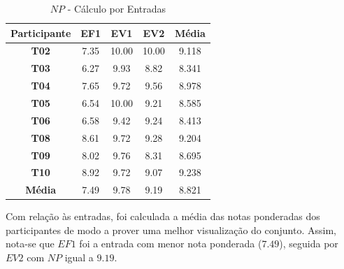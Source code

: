 \begin{table}[htbp]
	\centering
	\caption{$NP$ - Cálculo por Entradas}
	\begin{tabular}{|c|c|c|c|c|}
		\hline
		\rowcolor[HTML]{D0CECE} 
		\textbf{Participante} & \textbf{EF1} & \textbf{EV1} & \textbf{EV2} & \textbf{Média} \\ \hline
		\textbf{T02}          & 7.35         & 10.00        & 10.00        & 9.118          \\ \hline
		\rowcolor[HTML]{F2F2F2} 
		\textbf{T03}          & 6.27         & 9.93         & 8.82         & 8.341          \\ \hline
		\textbf{T04}          & 7.65         & 9.72         & 9.56         & 8.978          \\ \hline
		\rowcolor[HTML]{F2F2F2} 
		\textbf{T05}          & 6.54         & 10.00        & 9.21         & 8.585          \\ \hline
		\textbf{T06}          & 6.58         & 9.42         & 9.24         & 8.413          \\ \hline
		\rowcolor[HTML]{F2F2F2} 
		\textbf{T08}          & 8.61         & 9.72         & 9.28         & 9.204          \\ \hline
		\textbf{T09}          & 8.02         & 9.76         & 8.31         & 8.695          \\ \hline
		\rowcolor[HTML]{F2F2F2} 
		\textbf{T10}          & 8.92         & 9.72         & 9.07         & 9.238          \\ \hline
		\rowcolor[HTML]{D0CECE} 
		\textbf{Média}        & 7.49         & 9.78         & 9.19         & 8.821          \\ \hline
	\end{tabular}
	\label{tab:F3_A2_NP_ENTRADAS}
\end{table}

Com relação às entradas, foi calculada a média das notas ponderadas dos participantes de modo a prover uma melhor visualização do conjunto. Assim, nota-se que $EF1$ foi a entrada com menor nota ponderada ($7.49$), seguida por $EV2$ com $NP$ igual a $9.19$.


